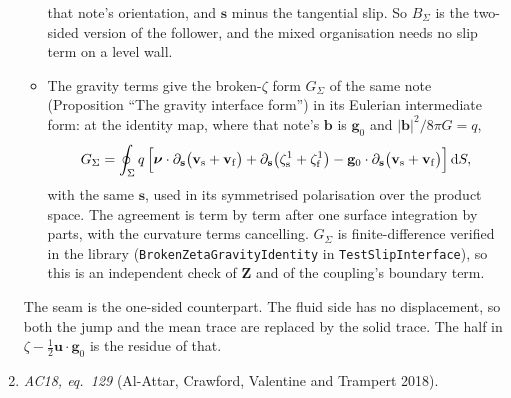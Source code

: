 \documentclass[11pt]{article}
\theoremstyle{definition}
\theoremstyle{remark}
\newcommand{\bu}{\mathbf{u}}
\newcommand{\bv}{\mathbf{v}}
\newcommand{\dS}{\,\mathrm{d}S}
\newcommand{\Div}{\operatorname{div}}
\newcommand{\code}[1]{\texttt{#1}}
\begin{document}
\begin{enumerate}
\begin{itemize}
    that note's orientation, and $\mathbf s$ minus the tangential slip.
    So $B_\Sigma$ is the two-sided version of the
    follower, and the mixed organisation needs no slip term on a level
    wall.
  \item The gravity terms give the broken-$\zeta$ form $G_\Sigma$ of
    the same note (Proposition ``The gravity interface form'') in its
    Eulerian intermediate form: at the identity map, where that note's
    $\mathbf b$ is $\mathbf g_0$ and $|\mathbf b|^2/8\pi G = q$,
    \begin{equation*}
      G_\Sigma = \oint_\Sigma q\,\Bigl[
        \boldsymbol\nu\cdot\partial_{\mathbf s}
          \bigl(\bv_{\mathrm s} + \bv_{\mathrm f}\bigr)
        + \partial_{\mathbf s}\bigl(\zeta^1_{\mathrm s}
          + \zeta^1_{\mathrm f}\bigr)
        - \mathbf g_0\cdot\partial_{\mathbf s}
          \bigl(\bv_{\mathrm s} + \bv_{\mathrm f}\bigr)
      \Bigr]\dS ,
    \end{equation*}
    with the same $\mathbf s$, used in its symmetrised polarisation
    over the product space. The agreement is term by term after one
    surface integration by parts, with the curvature terms cancelling.
    $G_\Sigma$ is finite-difference verified in the library
    (\code{BrokenZetaGravityIdentity} in \code{TestSlipInterface}), so
    this is an independent check of $\mathbf Z$ and of the coupling's
    boundary term.
  \end{itemize}
  The seam is the one-sided counterpart. The fluid side has no
  displacement, so both the jump and the mean trace are replaced by
  the solid trace. The half in $\zeta - \tfrac12\bu\cdot\mathbf g_0$ is
  the residue of that.
\item \emph{AC18, eq.~129} (Al-Attar, Crawford, Valentine and Trampert
  2018).
\end{enumerate}
\end{document}
